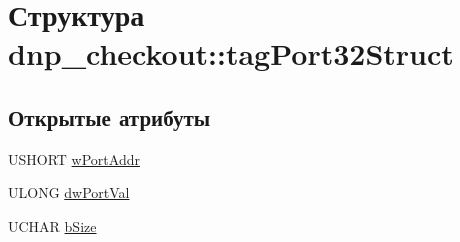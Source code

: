 \hypertarget{structdnp__checkout_1_1tag_port32_struct}{\section{Структура dnp\-\_\-checkout\-:\-:tag\-Port32\-Struct}
\label{structdnp__checkout_1_1tag_port32_struct}
}
\subsection*{Открытые атрибуты}
\begin{DoxyCompactItemize}
\item 
U\-S\-H\-O\-R\-T \hyperlink{structdnp__checkout_1_1tag_port32_struct_a405b7de7e55f389fa70f0b5a50b76894}{w\-Port\-Addr}
\item 
U\-L\-O\-N\-G \hyperlink{structdnp__checkout_1_1tag_port32_struct_a21c464a52dd63092e980b219e2b5b3be}{dw\-Port\-Val}
\item 
U\-C\-H\-A\-R \hyperlink{structdnp__checkout_1_1tag_port32_struct_a7ab5c4d0cdf89b437b188e7ac604ce9f}{b\-Size}
\end{DoxyCompactItemize}


